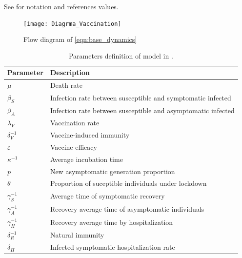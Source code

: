      See  for notation and references
     values.
     \begin{figure}[tbh]
    \centering
      \texttt{[image: Diagrma\_Vaccination]}
    \caption{Flow diagram of \cref{eqn:base_dynamics}}
    \label{fig:Flowdiagram}
\end{figure}
\begin{table}[h!]
	\centering
	\begin{tabular}{>{\centering}%
        p{}%
        p{}
    }
    \toprule
		\textbf{Parameter} & \textbf{Description}
  	\\
  	\midrule
		$\mu$ &
			Death rate
		\\
        $\beta_S$ &
        	Infection rate between susceptible and symptomatic infected
		\\
        $\beta_A$ &
        	Infection rate between susceptible and asymptomatic infected
		\\
        $\lambda_V$ &
        	Vaccination rate
		\\
        $\delta_{V}^{-1}$ &
        Vaccine-induced immunity
		\\
        $\varepsilon$ &
        	Vaccine efficacy
		\\
        $\kappa^{-1}$ &
        	Average incubation time
        \\
		$p$ &
			New asymptomatic generation proportion
		\\
	    $\theta$ &
        	Proportion of suceptible individuals under lockdown
        \\
        $\gamma_{S}^{-1}$ &
        	Average time of symptomatic recovery
        \\
		$\gamma_{A}^{-1}$ &
			Recovery average time of asymptomatic individuals
		\\
		$\gamma_{H}^{-1}$ &
			Recovery average time by hospitalization
		\\
        $\delta_{R}^{-1}$ &
        	Natural immunity
  		\\
  		$\delta_{H}$ &
        	Infected symptomatic hospitalization rate
  		\\
  	\bottomrule
	\end{tabular}
		\caption{
			Parameters definition of model in
			.}
    \label{tbl:dynamics_base_parameters}
\end{table}
%
